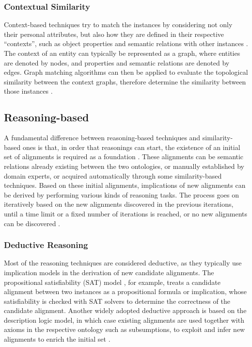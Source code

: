 \subsubsection{Contextual Similarity}

Context-based techniques try to match the instances by considering not only their personal attributes, but also how they are defined in their respective ``contexts'', such as object properties and semantic relations with other instances \cite{DBLP:journals/jucs/LinSX12}. The context of an entity can typically be represented as a graph, where entities are denoted by nodes, and properties and semantic relations are denoted by edges. Graph matching algorithms can then be applied to evaluate the topological similarity between the context graphs, therefore determine the similarity between those instances \cite{DBLP:conf/kdd/JehW02}.

\subsection{Reasoning-based}

A fundamental difference between reasoning-based techniques and similarity-based ones is that, in order that reasonings can start, the existence of an initial set of alignments is required as a foundation \cite{DBLP:conf/esws/Meilicke09}. These alignments can be semantic relations already existing between the two ontologies, or manually established by domain experts, or acquired automatically through some similarity-based techniques. Based on these initial alignments, implications of new alignments can be derived by performing various kinds of reasoning tasks. The process goes on iteratively based on the new alignments discovered in the previous iterations, until a time limit or a fixed number of iterations is reached, or no new alignments can be discovered \cite{DBLP:journals/logcom/MeilickeST09}.

\subsubsection{Deductive Reasoning}

Most of the reasoning techniques are considered deductive, as they typically use implication models in the derivation of new candidate alignments. The propositional satisfiability (SAT) model \cite{DBLP:journals/ai/PhamTS08}, for example, treats a candidate alignment between two instances as a propositional formula or implication, whose satisfiability is checked with SAT solvers to determine the correctness of the candidate alignment. Another widely adopted deductive approach is based on the description logic model, in which case existing alignments are used together with axioms in the respective ontology such as subsumptions, to exploit and infer new alignments to enrich the initial set \cite{DBLP:phd/ethos/Reul12}.

